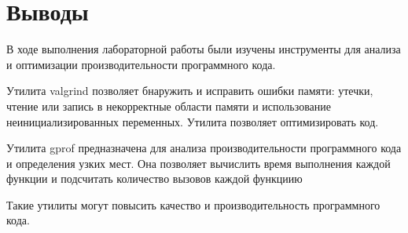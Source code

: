  
\section{Выводы}
В ходе выполнения лабораторной работы были изучены инструменты для анализа и оптимизации производительности программного кода.

Утилита valgrind позволяет бнаружить и исправить ошибки памяти: утечки, чтение или запись в некорректные области памяти и использование неинициализированных переменных. Утилита позволяет оптимизировать код.

Утилита gprof предназначена для анализа производительности программного кода и определения узких мест. Она позволяет вычислить время выполнения каждой функции и подсчитать количество вызовов каждой функциию

Такие утилиты могут повысить качество и производительность программного кода.
\pagebreak